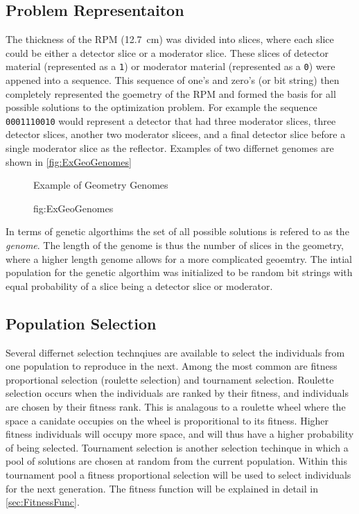 \subsection{Problem Representaiton}
The thickness of the RPM  (\SI{12.7}{\cm}) was divided into slices, where each slice could be either a detector slice or a moderator slice.
These slices of detector material (represented as a \verb+1+) or moderator material (represented as a \verb+0+) were appened into a sequence.
This sequence of one's and zero's (or bit string) then completely represented the goemetry of the RPM and formed the basis for all possible solutions to the optimization problem.
For example the sequence \verb+0001110010+ would represent a detector that had three moderator slices, three detector slices, another two moderator slicees, and a final detector slice before a single moderator slice as the reflector.
Examples of two differnet genomes are shown in \autoref{fig:ExGeoGenomes}
\begin{figure}

  \caption[Example Geometries Genomes]{Example of Geometry Genomes}
  \caption{fig:ExGeoGenomes}
\end{figure}
In terms of genetic algorthims the set of all possible solutions is refered to as the \textit{genome}.
The length of the genome is thus the number of slices in the geometry, where a higher length genome allows for a more complicated geoemtry.
The intial population for the genetic algorthim was initialized to be random bit strings with equal probability of a slice being a detector slice or moderator.

\subsection{Population Selection}
Several differnet selection technqiues are available to select the individuals from one population to reproduce in the next.
Among the most common are fitness proportional selection (roulette selection) and tournament selection.
Roulette selection occurs when the individuals are ranked by their fitness, and individuals are chosen by their fitness rank.
This is analagous to a roulette wheel where the space a canidate occupies on the wheel is proporitional to its fitness.
Higher fitness individuals will occupy more space, and will thus have a higher probability of being selected.
Tournament selection is another selection techinque in which a pool of solutions are chosen at random from the current population.
Within this tournament pool a fitness proportional selection will be used to select individuals for the next generation.
The fitness function will be explained in detail in \autoref{sec:FitnessFunc}.

